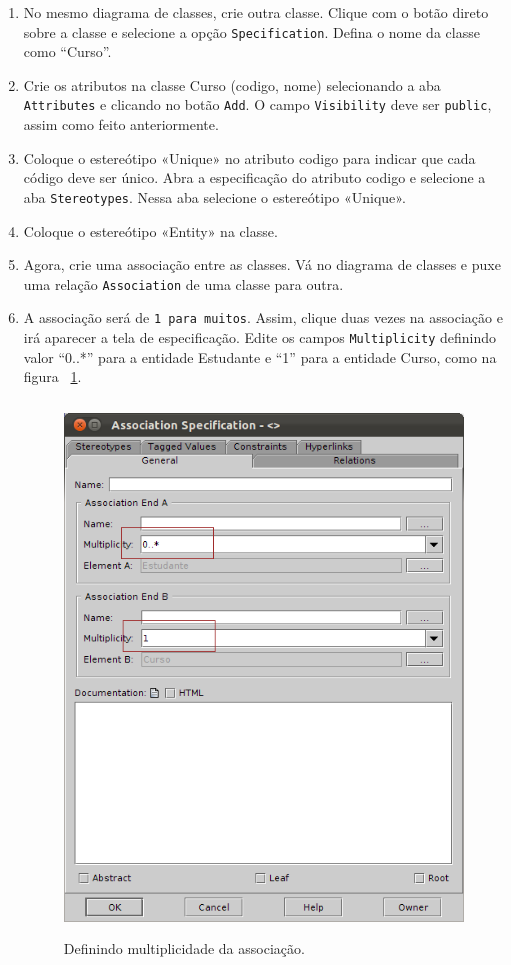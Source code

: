 \begin{enumerate}
\item No mesmo diagrama de classes, crie outra classe. Clique com o botão direto
sobre a classe e selecione a opção \texttt{Specification}. Defina o nome da classe como
“Curso”.
	
\item Crie os atributos na classe Curso (codigo, nome) selecionando a aba
\texttt{Attributes} e clicando no botão \texttt{Add}. O campo \texttt{Visibility} deve ser \texttt{public}, assim
como feito anteriormente.

\item Coloque o estereótipo «Unique» no atributo codigo para indicar que cada
código deve ser único. Abra a especificação do atributo codigo e selecione a aba
\texttt{Stereotypes}. Nessa aba selecione o estereótipo «Unique».
	
\item Coloque o estereótipo «Entity» na classe.
	
\item Agora, crie uma associação entre as classes. Vá no diagrama de classes e
puxe uma relação \texttt{Association} de uma classe para outra.
	
\item A associação será de \texttt{1 para muitos}. Assim, clique duas vezes na associação
e irá aparecer a tela de especificação. Edite os campos \texttt{Multiplicity} definindo
valor “0..*” para a entidade Estudante e “1” para a entidade Curso, como na
figura ~\ref{define_multiplicidade_associacao}.
\begin{figure}[H]
	\centering
	\includegraphics[width=350pt,height=400pt]{imgs/tutorial-mdarte-0005.png}
	\caption{Definindo multiplicidade da associação.}
	\label{define_multiplicidade_associacao}
\end{figure}
	

\end{enumerate}

